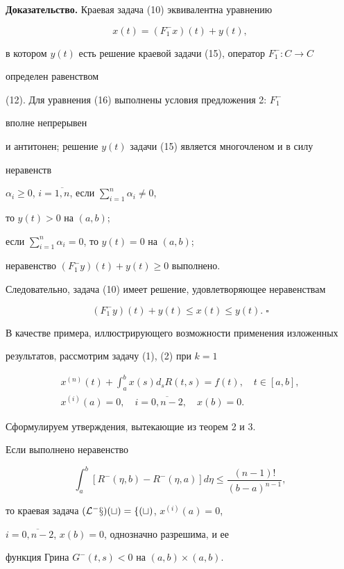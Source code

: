  


{\bf Доказательство.} Краевая задача (10) эквивалентна уравнению 


\begin{equation} 


x(t)=(F^-_1x)(t)+y(t), 


\end{equation} 


в котором $y(t)$ есть решение краевой задачи (15), оператор $F^-_1:C\to C$ 


определен равенством 


(12). Для уравнения (16) выполнены условия предложения 2: $F^-_1$ 


вполне непрерывен 


и антитонен; решение $y(t)$ задачи (15) является многочленом и в силу 


неравенств 


$\alpha_i\ge 0$, $i=\overline{1,n}$, если $\sum^n_{i=1}\alpha_i\ne 0$, 


то $y(t)>0$ на $(a,b)$; 


если $\sum^n_{i=1}\alpha_i=0$, то $y(t)=0$ на $(a,b)$; 


неравенство $(F^-_1y)(t)+y(t)\ge 0$ выполнено.


Следовательно, задача (10) имеет решение, удовлетворяющее неравенствам 


$$ 


(F^-_1y)(t)+y(t) \le x(t)\le y(t). \;\square


$$ 


 


В качестве примера, иллюстрирующего возможности применения изложенных 


результатов, рассмотрим задачу (1), (2) при $k=1$ 


\begin{gather} 


x^{(n)}(t)+\int^b_ax(s)d_sR(t,s)=f(t),\quad t\in[a,b],\\ 


x^{(i)}(a)=0,\quad i=\overline{0,n-2},\quad x(b)=0.


\end{gather} 


Сформулируем утверждения, вытекающие из теорем 2 и 3. 


 


\begin{assrt} Если выполнено неравенство 


\begin{equation} 


\int^b_a[R^-(\eta,b)-R^-(\eta,a)]d\eta \le \frac{(n-1)!}{(b-a)^{n-1} }, 


\end{equation} 


то краевая задача $(\cal L^-x)(t)=f(t)$, $x^{(i)}(a)=0$, 


$i=\overline{0,n-2}$, $x(b)=0$, однозначно разрешима, и ее 


функция Грина $G^-(t,s)<0$ на $(a,b)\times(a,b)$. 


\end{assrt} 


